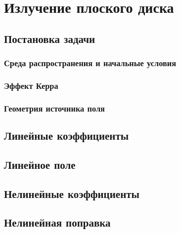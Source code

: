 \chapter{Излучение плоского диска}
\label{ch:pdisk}

\section{Постановка задачи}
\subsection{Среда распространения и начальные условия}
\subsection{Эффект Керра}
\subsection{Геометрия источника поля}

\section{Линейные коэффициенты}

\section{Линейное поле}

\section{Нелинейные коэффициенты}

\section{Нелинейная поправка}
